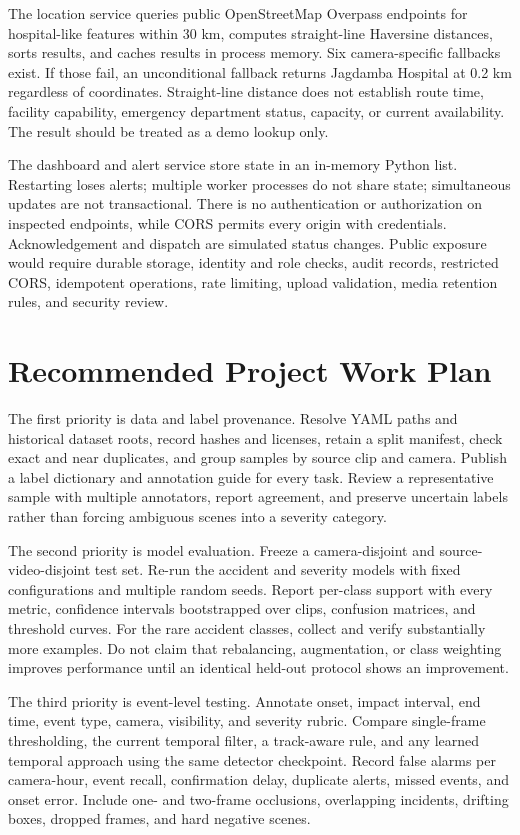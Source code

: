 \documentclass[12pt,a4paper]{article}
\begin{document}
The location service queries public OpenStreetMap Overpass endpoints for hospital-like features within 30 km, computes straight-line Haversine distances, sorts results, and caches results in process memory. Six camera-specific fallbacks exist. If those fail, an unconditional fallback returns Jagdamba Hospital at 0.2 km regardless of coordinates. Straight-line distance does not establish route time, facility capability, emergency department status, capacity, or current availability. The result should be treated as a demo lookup only.

The dashboard and alert service store state in an in-memory Python list. Restarting loses alerts; multiple worker processes do not share state; simultaneous updates are not transactional. There is no authentication or authorization on inspected endpoints, while CORS permits every origin with credentials. Acknowledgement and dispatch are simulated status changes. Public exposure would require durable storage, identity and role checks, audit records, restricted CORS, idempotent operations, rate limiting, upload validation, media retention rules, and security review.

\section{Recommended Project Work Plan}
The first priority is data and label provenance. Resolve YAML paths and historical dataset roots, record hashes and licenses, retain a split manifest, check exact and near duplicates, and group samples by source clip and camera. Publish a label dictionary and annotation guide for every task. Review a representative sample with multiple annotators, report agreement, and preserve uncertain labels rather than forcing ambiguous scenes into a severity category.

The second priority is model evaluation. Freeze a camera-disjoint and source-video-disjoint test set. Re-run the accident and severity models with fixed configurations and multiple random seeds. Report per-class support with every metric, confidence intervals bootstrapped over clips, confusion matrices, and threshold curves. For the rare accident classes, collect and verify substantially more examples. Do not claim that rebalancing, augmentation, or class weighting improves performance until an identical held-out protocol shows an improvement.

The third priority is event-level testing. Annotate onset, impact interval, end time, event type, camera, visibility, and severity rubric. Compare single-frame thresholding, the current temporal filter, a track-aware rule, and any learned temporal approach using the same detector checkpoint. Record false alarms per camera-hour, event recall, confirmation delay, duplicate alerts, missed events, and onset error. Include one- and two-frame occlusions, overlapping incidents, drifting boxes, dropped frames, and hard negative scenes.
\end{document}
